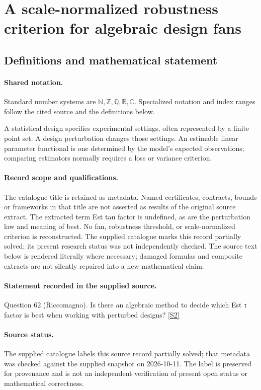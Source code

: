 \documentclass[11pt]{article}
\newcommand{\sref}[2]{\hyperlink{source:#1:#2}{[S#2]}}
\begin{document}
\section{A scale-normalized robustness criterion for algebraic design fans}\label{statement}

\subsection{Definitions and mathematical statement}

\paragraph{Shared notation.}Standard number systems are $\mathbb N,\mathbb Z,\mathbb Q,\mathbb R,\mathbb C$. Specialized notation and index ranges follow the cited source and the definitions below.


A statistical design specifies experimental settings, often represented by a finite point set. A design perturbation changes those settings. An estimable linear parameter functional is one determined by the model's expected observations; comparing estimators normally requires a loss or variance criterion.
\paragraph{Record scope and qualifications.}
The catalogue title is retained as metadata. Named certificates, contracts, bounds or frameworks in that title are not asserted as results of the original source extract.
The extracted term Est tau factor is undefined, as are the perturbation law and meaning of best. No fan, robustness threshold, or scale-normalized criterion is reconstructed. The supplied catalogue marks this record partially solved; its present research status was not independently checked.
The source text below is rendered literally where necessary; damaged formulas and composite extracts are not silently repaired into a new mathematical claim.
\paragraph{Statement recorded in the supplied source.}
Question 62 (Riccomagno). Is there an algebraic method to decide which Est τ factor is best when working with perturbed designs? \sref{statement}{2}
\paragraph{Source status.}
The supplied catalogue labels this source record partially solved; that metadata was checked against the supplied snapshot on 2026-10-11. The label is preserved for provenance and is not an independent verification of present open status or mathematical correctness.
\end{document}
